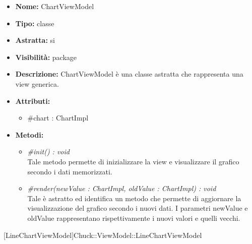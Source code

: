 			
			\begin{itemize}
			\item \textbf{Nome:} ChartViewModel
			\item \textbf{Tipo:} classe
			
		\item \textbf{Astratta:}
		si
			\item \textbf{Visibilità:} package
			\item \textbf{Descrizione:} ChartViewModel è una classe astratta che rappresenta una view generica.
			\item \textbf{Attributi:}
				\begin{itemize}
				\setlength{\itemsep}{5pt}
				
					\item[\ding{111}] {\#chart : ChartImpl}
				\end{itemize}
		
			\item \textbf{Metodi:}
				\begin{itemize}
				\setlength{\itemsep}{5pt}
				
					\item[\ding{111}] \textit{{\#init() : void}} \\ [1mm] Tale metodo permette di inizializzare la view e visualizzare il grafico secondo i dati memorizzati.
					\item[\ding{111}] \textit{{\#render(newValue : ChartImpl, oldValue : ChartImpl) : void}} \\ [1mm] Tale è astratto ed identifica un metodo che permette di aggiornare la visualizzazione del grafico secondo i nuovi dati. I parametri newValue e oldValue rappresentano rispettivamente i nuovi valori e quelli vecchi.
				\end{itemize}
		
			\end{itemize}

			
			[LineChartViewModel]{Chuck::ViewModel::LineChartViewModel}
			

	

